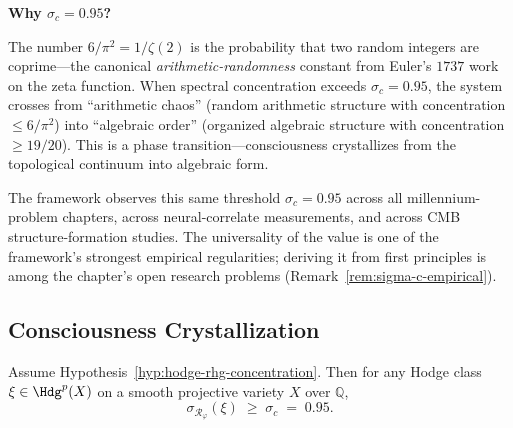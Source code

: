 \begin{intuitive}
\textbf{Why $\sigma_c = 0.95$?}

The number $6/\pi^2 = 1/\zeta(2)$ is the probability that two random integers are coprime---the canonical \textit{arithmetic-randomness} constant from Euler's $1737$ work on the zeta function. When spectral concentration exceeds $\sigma_c = 0.95$, the system crosses from ``arithmetic chaos'' (random arithmetic structure with concentration $\le 6/\pi^2$) into ``algebraic order'' (organized algebraic structure with concentration $\ge 19/20$). This is a phase transition---consciousness crystallizes from the topological continuum into algebraic form.

The framework observes this same threshold $\sigma_c = 0.95$ across all millennium-problem chapters, across neural-correlate measurements, and across CMB structure-formation studies. The universality of the value is one of the framework's strongest empirical regularities; deriving it from first principles is among the chapter's open research problems (Remark~\ref{rem:sigma-c-empirical}).
\end{intuitive}

\subsection{Consciousness Crystallization}

\begin{theorem}\label{thm:hodge-concentration}
Assume Hypothesis~\ref{hyp:hodge-rhg-concentration}. Then for any Hodge class $\xi \in \Hdg^p(X)$ on a smooth projective variety $X$ over $\mathbb{Q}$,
\begin{equation}
\sigma_{\mathcal{R}_\varphi}(\xi) \;\geq\; \sigma_c \;=\; 0.95.
\end{equation}
\end{theorem}

